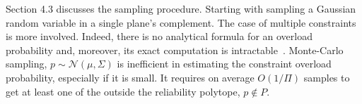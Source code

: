 Section 4.3 discusses the sampling procedure. Starting with sampling a Gaussian random variable in a single plane's complement.%
The case of multiple constraints is more involved. Indeed, there is no analytical formula for an overload probability and, moreover, its exact computation is intractable~\cite{khachiyan1989problem}. 
Monte-Carlo sampling, $p\sim \mathcal{N}(\mu, \Sigma)$ is inefficient in estimating the constraint overload probability, especially if it is small. It requires on average $O(1/\Pi)$ samples to get at least one of the outside the reliability polytope, $p\not\in P$.

